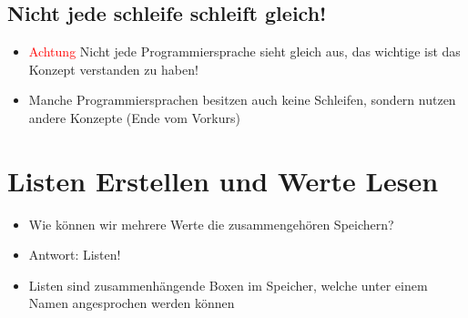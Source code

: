 \livecoding

\subsection{Nicht jede schleife schleift gleich!}
\begin{frame}
    \slidehead

    \begin{itemize}
        \item \textcolor{red}{Achtung} Nicht jede Programmiersprache sieht gleich aus, das wichtige ist das Konzept verstanden zu haben!
        \item Manche Programmiersprachen besitzen auch keine Schleifen, sondern nutzen andere Konzepte (Ende vom Vorkurs)
    \end{itemize}
\end{frame}

\section{Listen Erstellen und Werte Lesen}
\begin{frame}
    \slidehead

    \begin{itemize}
        \item Wie können wir mehrere Werte die zusammengehören Speichern?
        \item Antwort: Listen!
        \item Listen sind zusammenhängende Boxen im Speicher, welche unter einem Namen angesprochen werden können
    \end{itemize}

    \begin{center}
    \label{fig:figure}
    \end{center}

\end{frame}


